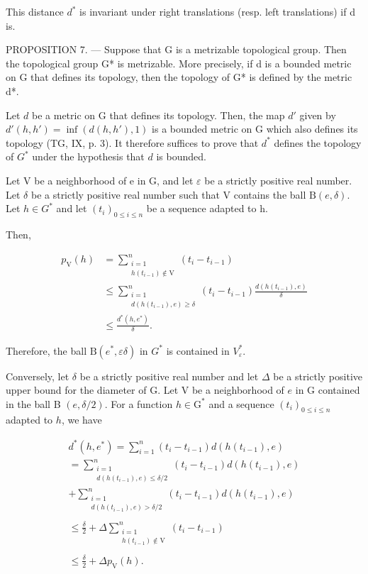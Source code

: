 This distance \(d^{*}\) is invariant under right translations (resp. left translations) if d is.

PROPOSITION 7. --- Suppose that G is a metrizable topological group. Then the topological group G* is metrizable. More precisely, if d is a bounded metric on G that defines its topology, then the topology of G* is defined by the metric d*.

Let \(d\) be a metric on G that defines its topology. Then, the map \(d'\) given by \(d'(h,h') = \inf (d(h,h'),1)\) is a bounded metric on G which also defines its topology (TG, IX, p. 3). It therefore suffices to prove that \(d^{*}\) defines the topology of \(G^{*}\) under the hypothesis that \(d\) is bounded.

Let V be a neighborhood of e in G, and let \(\varepsilon\) be a strictly positive real number. Let \(\delta\) be a strictly positive real number such that V contains the ball \(\mathrm{B}(e,\delta)\). Let \(h \in G^{*}\) and let \((t_{i})_{0 \leqslant i \leqslant n}\) be a sequence adapted to h.

Then,

\[
\begin{aligned} p_{\mathrm{V}}(h) & = \sum_{\substack{i = 1\\ h(t_{i - 1})\not\in\mathrm{V}}}^{n}(t_{i} - t_{i - 1})\\ & \leqslant \sum_{\substack{i = 1\\ d(h(t_{i - 1}),e)\geqslant \delta}}^{n}(t_{i} - t_{i - 1})\frac{d(h(t_{i - 1}),e)}{\delta}\\ & \leqslant \frac{d^{*}(h,e^{*})}{\delta}. \end{aligned}
\]

Therefore, the ball \(\mathrm{B}(e^{*},\varepsilon\delta)\) in \(G^{*}\) is contained in \(V_{\varepsilon}^{*}\).

Conversely, let \(\delta\) be a strictly positive real number and let \(\Delta\) be a strictly positive upper bound for the diameter of G. Let V be a neighborhood of \(e\) in G contained in the ball B \((e,\delta/2)\). For a function \(h\in\mathrm{G}^{*}\) and a sequence \((t_{i})_{0\leqslant i\leqslant n}\) adapted to \(h\), we have

\[
\begin{array}{l}d^{*}(h,e^{*}) = \sum_{i = 1}^{n}(t_{i} - t_{i - 1})d(h(t_{i - 1}),e)\\ = \sum_{\substack{i = 1\\ d(h(t_{i - 1}),e)\leqslant \delta /2}}^{n}(t_{i} - t_{i - 1})d(h(t_{i - 1}),e)\\ +\sum_{\substack{i = 1\\ d(h(t_{i - 1}),e) > \delta /2}}^{n}(t_{i} - t_{i - 1})d(h(t_{i - 1}),e)\\ \\ \leqslant \frac{\delta}{2} +\Delta \sum_{\substack{i = 1\\ h(t_{i - 1})\not\in\mathrm{V}}}^{n}(t_{i} - t_{i - 1})\\ \\ \leqslant \frac{\delta}{2} +\Delta p_{\mathrm{V}}(h). \end{array}
\]


